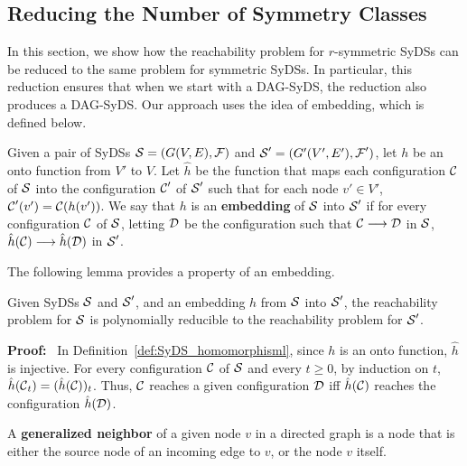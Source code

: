 \subsection{Reducing the Number of Symmetry Classes}
\label{sse:r_symmetric}

In this section, we show how the reachability problem for
$r$-symmetric SyDSs can be reduced to the same problem for
symmetric SyDSs.
In particular, this reduction ensures that when we start
with a DAG-SyDS, the reduction also produces a DAG-SyDS.
Our approach uses the idea of embedding, which is defined below.

\begin{definition}\label{def:SyDS_homomorphisml}
Given a pair of SyDSs $\mbox{$\mathcal{S}$} = (G(V,E), \mbox{$\mathcal{F}$})$ and $\mbox{$\mathcal{S}$}' = (G'(V',E'), \mbox{$\mathcal{F}$}')$,
let $h$ be an onto function from $V'$ to $V$.
Let $\hat{h}$ be the function that maps each configuration $\mbox{$\mathcal{C}$}$ of $\mbox{$\mathcal{S}$}$
into the configuration $\mbox{$\mathcal{C}$}'$ of $\mbox{$\mathcal{S}$}'$ 
such that for each node $v' \in V'$, 
$\mbox{$\mathcal{C}$}'(v') = \mbox{$\mathcal{C}$}(h(v'))$.
We say that $h$ is an \textbf{embedding} of $\mbox{$\mathcal{S}$}$ into $\mbox{$\mathcal{S}$}'$
if for every configuration $\mbox{$\mathcal{C}$}$ of $\mbox{$\mathcal{S}$}$,
letting $\mbox{$\mathcal{D}$}$  be the configuration such that $\mbox{$\mathcal{C}$} \longrightarrow \mbox{$\mathcal{D}$}$ in $\mbox{$\mathcal{S}$}$,
$\hat{h}(\mbox{$\mathcal{C}$}) \longrightarrow \hat{h}(\mbox{$\mathcal{D}$})$ in $\mbox{$\mathcal{S}$}'$.
\end{definition}

The following lemma provides a property of an embedding.

\begin{lemma}\label{lem:embedding_reachability}
 Given SyDSs $\mbox{$\mathcal{S}$}$ and $\mbox{$\mathcal{S}$}'$, and an embedding $h$ from $\mbox{$\mathcal{S}$}$ into  $\mbox{$\mathcal{S}$}'$,
the reachability problem for $\mbox{$\mathcal{S}$}$ is polynomially reducible
to the reachability problem for $\mbox{$\mathcal{S}$}'$.
\end{lemma}

\noindent
\textbf{Proof:}~
In Definition~\ref{def:SyDS_homomorphisml},
since $h$ is an onto function, $\hat{h}$  is injective.
For every configuration $\mbox{$\mathcal{C}$}$ of $\mbox{$\mathcal{S}$}$ and every $t \geq 0$,
by induction on $t$,
$\hat{h}(\mbox{$\mathcal{C}$}_t) = (\hat{h}(\mbox{$\mathcal{C}$}))_t $.
Thus, $\mbox{$\mathcal{C}$}$ reaches a given configuration $\mbox{$\mathcal{D}$}$
iff $\hat{h}(\mbox{$\mathcal{C}$})$ reaches the configuration $\hat{h}(\mbox{$\mathcal{D}$})$.
\QED

\begin{definition}\label{tdef:generalized_neighbor}
A {\bf generalized neighbor} of a given node $v$ in a directed graph is a node that
is either the source node of an incoming edge to $v$, or the node $v$  itself.
\end{definition}

